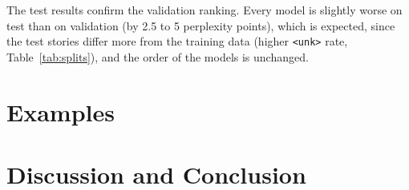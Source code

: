 \documentclass[11pt]{article}
\begin{document}
The test results confirm the validation ranking. Every model is slightly
worse on test than on validation (by 2.5 to 5 perplexity points), which
is expected, since the test stories differ more from the training data
(higher \texttt{<unk>} rate, Table~\ref{tab:splits}), and the order of
the models is unchanged.

\section{Examples}

\section{Discussion and Conclusion}
\end{document}

